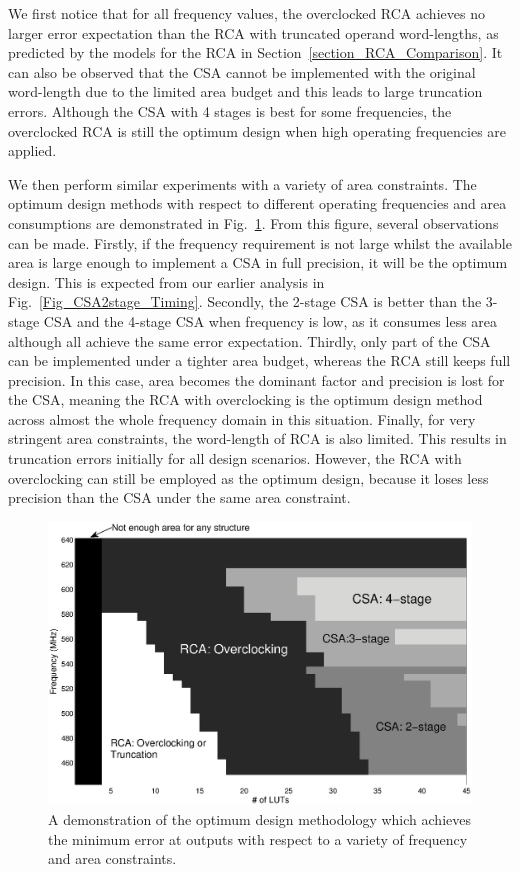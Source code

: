 \documentclass[prodmode,acmtrets]{acmsmall} %
\begin{document}
We first notice that for all frequency values, the overclocked RCA achieves no larger error expectation than the RCA with truncated operand word-lengths, as predicted by the models for the RCA in Section~\ref{section_RCA_Comparison}. It can also be observed that the CSA cannot be implemented with the original word-length due to the limited area budget and this leads to large truncation errors. Although the CSA with 4 stages is best for some frequencies, the overclocked RCA is still the optimum design when high operating frequencies are applied.

We then perform similar experiments with a variety of area constraints. The optimum design methods with respect to different operating frequencies and area consumptions are demonstrated in Fig.~\ref{Fig_CSA_Tradeoff}. From this figure, several observations can be made. Firstly, if the frequency requirement is not large whilst the available area is large enough to implement a CSA in full precision, it will be the optimum design. This is expected from our earlier analysis in Fig.~\ref{Fig_CSA2stage_Timing}. Secondly, the 2-stage CSA is better than the 3-stage CSA and the 4-stage CSA when frequency is low, as it consumes less area although all achieve the same error expectation. Thirdly, only part of the CSA can be implemented under a tighter area budget, whereas the RCA still keeps full precision. In this case, area becomes the dominant factor and precision is lost for the CSA, meaning the RCA with overclocking is the optimum design method across almost the whole frequency domain in this situation. Finally, for very stringent area constraints, the word-length of RCA is also limited. This results in truncation errors initially for all design scenarios. However, the RCA with overclocking can still be employed as the optimum design, because it loses less precision than the CSA under the same area constraint.
%
\begin{figure}[t]
  \centering
  \vspace{-2ex}
  \includegraphics[width=4.5in]{./Figures/Tradeoff_Freq.eps}
  \vspace{-2ex}
  \caption{A demonstration of the optimum design methodology which achieves the minimum error at outputs with respect to a variety of frequency and area constraints.}
  \label{Fig_CSA_Tradeoff}
\end{figure}
\end{document}

